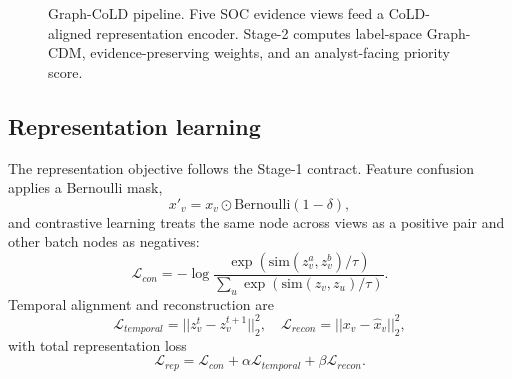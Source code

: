 \documentclass[11pt]{article}
\begin{document}
\begin{figure}[t]
\centering
{}
\caption{Graph-CoLD pipeline. Five SOC evidence views feed a CoLD-aligned representation encoder. Stage-2 computes label-space Graph-CDM, evidence-preserving weights, and an analyst-facing priority score.}
\label{fig:pipeline}
\end{figure}

\subsection{Representation learning}
The representation objective follows the Stage-1 contract. Feature confusion applies a Bernoulli mask,
\begin{equation}
x'_v=x_v\odot \mathrm{Bernoulli}(1-\delta),
\end{equation}
and contrastive learning treats the same node across views as a positive pair and other batch nodes as negatives:
\begin{equation}
\mathcal{L}_{con}=-\log\frac{\exp(\mathrm{sim}(z_v^a,z_v^b)/\tau)}{\sum_u\exp(\mathrm{sim}(z_v,z_u)/\tau)}.
\end{equation}
Temporal alignment and reconstruction are
\begin{equation}
\mathcal{L}_{temporal}=||z_v^t-z_v^{t+1}||_2^2,\quad
\mathcal{L}_{recon}=||x_v-\hat{x}_v||_2^2,
\end{equation}
with total representation loss
\begin{equation}
\mathcal{L}_{rep}=\mathcal{L}_{con}+\alpha\mathcal{L}_{temporal}+\beta\mathcal{L}_{recon}.
\end{equation}
\end{document}
